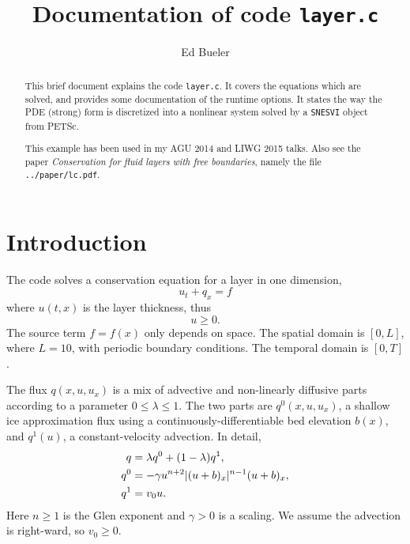 \documentclass[11pt]{amsart}
\title{Documentation of code \texttt{layer.c}}
\author{Ed Bueler}
\begin{document}
\begin{abstract}
This brief document explains the code \texttt{layer.c}.  It covers the equations which are solved, and provides some documentation of the runtime options.  It states the way the PDE (strong) form is discretized into a nonlinear system solved by a \texttt{SNESVI} object from PETSc.

This example has been used in my AGU 2014 and LIWG 2015 talks.  Also see the paper \emph{Conservation for fluid layers with free boundaries}, namely the file \verb|../paper/lc.pdf|.
\end{abstract}

\maketitle

\thispagestyle{empty}

\baselineskip=12pt
\parskip=5pt


\section{Introduction}

The code solves a conservation equation for a layer in one dimension,
\begin{equation}
u_t + q_x = f  \label{eq:conserve}
\end{equation}
where $u(t,x)$ is the layer thickness, thus
\begin{equation}
u \ge 0. \label{eq:constraint}
\end{equation}
The source term $f=f(x)$ only depends on space.  The spatial domain is $[0,L]$, where $L=10$, with periodic boundary conditions.  The temporal domain is $[0,T]$.

The flux $q(x,u,u_x)$ is a mix of advective and non-linearly diffusive parts according to a parameter $0\le \lambda \le 1$.  The two parts are $q^0(x,u,u_x)$, a shallow ice approximation flux using a continuously-differentiable bed elevation $b(x)$, and $q^1(u)$, a constant-velocity advection.  In detail,
\begin{align}
    q &= \lambda q^0 + (1-\lambda) q^1,  \label{eq:fluxform} \\
  q^0 &= - \gamma u^{n+2} |(u+b)_x|^{n-1} (u+b)_x, \notag \\
  q^1 &= v_0 u. \notag
\end{align}
Here $n\ge 1$ is the Glen exponent and $\gamma>0$ is a scaling.  We assume the advection is right-ward, so $v_0 \ge 0$.
\end{document}
